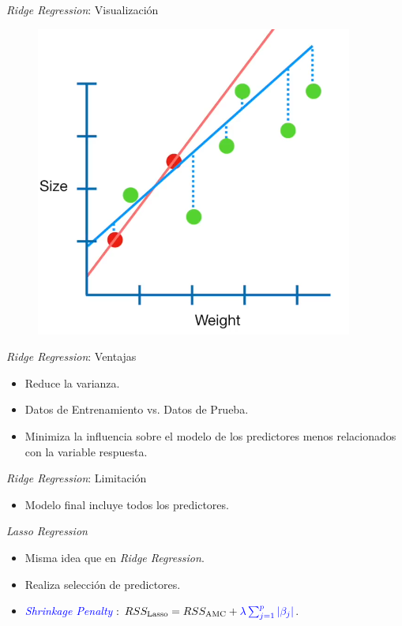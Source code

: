 \documentclass[11pt]{beamer}\usepackage{knitr}
\begin{document}
\begin{frame}{\textit{Ridge Regression}: Visualización}
	\begin{figure}
		\includegraphics[scale=0.4]{figures/ridge.png}
	\end{figure}
\end{frame}


\begin{frame}{\textit{Ridge Regression}: Ventajas}
	\begin{itemize}
		\item Reduce la varianza.
		\pause
		\item Datos de Entrenamiento vs. Datos de Prueba.
		\pause
		\item Minimiza la influencia sobre el modelo de los predictores menos relacionados con la variable respuesta.
	\end{itemize}
\end{frame}

\begin{frame}{\textit{Ridge Regression}: Limitación}
	\begin{itemize}
		\item Modelo final incluye todos los predictores.
	\end{itemize}
\end{frame}

\begin{frame}{\textit{Lasso Regression}}
	\begin{itemize}
		\item Misma idea que en \textit{Ridge Regression}.
		\pause
		\item Realiza selección de predictores.
		\pause
		\item \textcolor{blue}{\textit{Shrinkage Penalty}} : $RSS_{\text{Lasso}} = RSS_{\text{AMC}} + \textcolor{blue}{\lambda \sum^p_{j=1} |\beta_j|}$.
	\end{itemize}
\end{frame}
\end{document}
